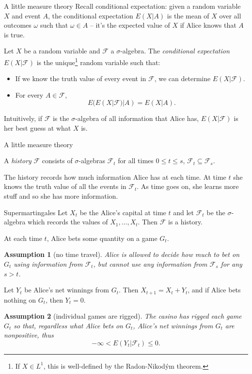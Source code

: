 \documentclass[10pt]{beamer}
\newtheorem{assumption}{Assumption}
\begin{document}
\begin{frame}{A little measure theory}
Recall conditional expectation: given a random variable $X$ and event $A$, the conditional expectation $E(X|A)$ is the mean of $X$ over all outcomes $\omega$ such that $\omega \in A$ -- it's the expected value of $X$ if Alice knows that $A$ is true.

\begin{definition}
Let $X$ be a random variable and $\mathcal F$ a $\sigma$-algebra.
The \emph{conditional expectation} $E(X|\mathcal F)$ is the unique\footnote{If $X \in L^1$, this is well-defined by the Radon-Nikod\'ym theorem.} random variable such that:
\begin{itemize}
\item If we know the truth value of every event in $\mathcal F$, we can determine $E(X|\mathcal F)$.
\item For every $A \in \mathcal F$,
$$E(E(X|\mathcal F)|A) = E(X|A).$$
\end{itemize}
\end{definition}

Intuitively, if $\mathcal F$ is the $\sigma$-algebra of all information that Alice has, $E(X|\mathcal F)$ is her best guess at what $X$ is.
\end{frame}

\begin{frame}{A little measure theory}
\begin{definition}
A \emph{history} $\mathcal F$ consists of $\sigma$-algebras $\mathcal F_t$ for all times $0 \leq t \leq s$, $\mathcal F_t \subseteq \mathcal F_s$.
\end{definition}

The history records how much information Alice has at each time.
At time $t$ she knows the truth value of all the events in $\mathcal F_t$.
As time goes on, she learns more stuff and so she has more information.
\end{frame}

\begin{frame}{Supermartingales}
Let $X_t$ be the Alice's capital at time $t$ and let $\mathcal F_t$ be the $\sigma$-algebra which records the values of $X_1, \dots, X_t$.
Then $\mathcal F$ is a history.

At each time $t$, Alice bets some quantity on a game $G_t$.

\begin{assumption}[no time travel]
Alice is allowed to decide how much to bet on $G_t$ using information from $\mathcal F_t$, but cannot use any information from $\mathcal F_s$ for any $s > t$.
\end{assumption}

Let $Y_t$ be Alice's net winnings from $G_t$. Then $X_{t + 1} = X_t + Y_t$, and if Alice bets nothing on $G_t$, then $Y_t = 0$.

\begin{assumption}[individual games are rigged]
The casino has rigged each game $G_t$ so that, regardless what Alice bets on $G_t$, Alice's net winnings from $G_t$ are nonpositive, thus
$$-\infty < E(Y_t|\mathcal F_t) \leq 0.$$
\end{assumption}
\end{frame}
\end{document}
